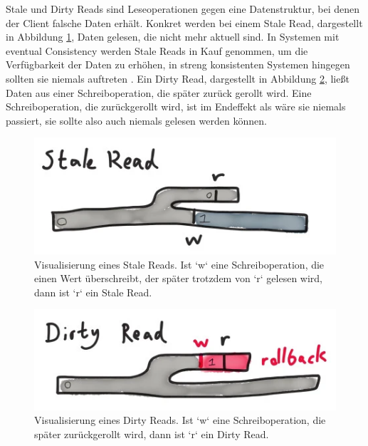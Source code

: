 \documentclass[12pt,a4paper]{report}
\begin{document}
Stale und Dirty Reads sind Leseoperationen gegen eine Datenstruktur, bei denen der Client falsche Daten erhält. Konkret werden bei
einem Stale Read, dargestellt in Abbildung \ref{fig:stale_read}, Daten gelesen, die nicht mehr aktuell sind. In Systemen mit
eventual Consistency werden Stale Reads in Kauf genommen, um die Verfügbarkeit der Daten zu erhöhen, in streng konsistenten
Systemen hingegen sollten sie niemals auftreten \cite{analysis_of_network_partition_failures}. Ein Dirty Read, dargestellt in
Abbildung \ref{fig:dirty_read}, ließt Daten aus einer Schreiboperation, die später zurück gerollt wird. Eine Schreiboperation, die
zurückgerollt wird, ist im Endeffekt als wäre sie niemals passiert, sie sollte also auch niemals gelesen werden können.
\cite{jepsen_mongo_analysis}


\begin{figure}[H]
	\centering
	\includegraphics[width=0.7\linewidth]{img/stale_read.png}
    \caption{Visualisierung eines Stale Reads. Ist `w` eine Schreiboperation, die einen Wert überschreibt, der später trotzdem von `r`
    gelesen wird, dann ist `r` ein Stale Read. \cite{jepsen_mongo_analysis}}
	\label{fig:stale_read}
\end{figure}

\begin{figure}[H]
	\centering
	\includegraphics[width=0.7\linewidth]{img/dirty_read.png}
	\caption{Visualisierung eines Dirty Reads. Ist `w` eine Schreiboperation, die später zurückgerollt wird, dann ist `r` ein
		Dirty Read. \cite{jepsen_mongo_analysis}}
	\label{fig:dirty_read}
\end{figure}
\end{document}
